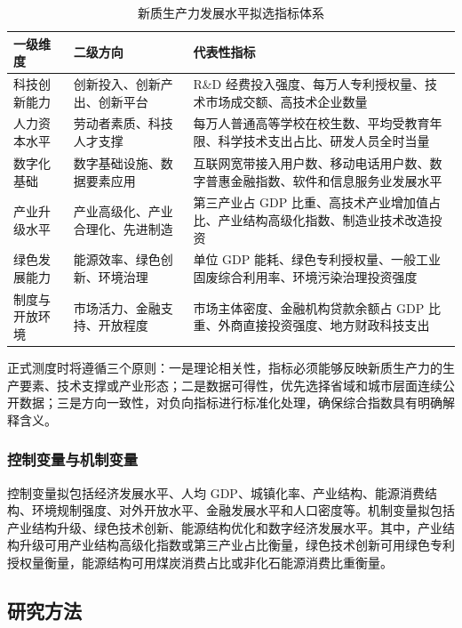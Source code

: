 \documentclass[UTF8,a4paper,zihao=-4,fontset=windows]{ctexart}
\begin{document}
\begin{longtable}{>{\raggedright\arraybackslash}p{}>{\raggedright\arraybackslash}p{}>{\raggedright\arraybackslash}p{}}
  \caption{新质生产力发展水平拟选指标体系}\\
  \toprule
  一级维度 & 二级方向 & 代表性指标\\
  \midrule
  科技创新能力 & 创新投入、创新产出、创新平台 & R\&D 经费投入强度、每万人专利授权量、技术市场成交额、高技术企业数量\\
  人力资本水平 & 劳动者素质、科技人才支撑 & 每万人普通高等学校在校生数、平均受教育年限、科学技术支出占比、研发人员全时当量\\
  数字化基础 & 数字基础设施、数据要素应用 & 互联网宽带接入用户数、移动电话用户数、数字普惠金融指数、软件和信息服务业发展水平\\
  产业升级水平 & 产业高级化、产业合理化、先进制造 & 第三产业占 GDP 比重、高技术产业增加值占比、产业结构高级化指数、制造业技术改造投资\\
  绿色发展能力 & 能源效率、绿色创新、环境治理 & 单位 GDP 能耗、绿色专利授权量、一般工业固废综合利用率、环境污染治理投资强度\\
  制度与开放环境 & 市场活力、金融支持、开放程度 & 市场主体密度、金融机构贷款余额占 GDP 比重、外商直接投资强度、地方财政科技支出\\
  \bottomrule
\end{longtable}

正式测度时将遵循三个原则：一是理论相关性，指标必须能够反映新质生产力的生产要素、技术支撑或产业形态；二是数据可得性，优先选择省域和城市层面连续公开数据；三是方向一致性，对负向指标进行标准化处理，确保综合指数具有明确解释含义。

\subsubsection{控制变量与机制变量}

控制变量拟包括经济发展水平、人均 GDP、城镇化率、产业结构、能源消费结构、环境规制强度、对外开放水平、金融发展水平和人口密度等。机制变量拟包括产业结构升级、绿色技术创新、能源结构优化和数字经济发展水平。其中，产业结构升级可用产业结构高级化指数或第三产业占比衡量，绿色技术创新可用绿色专利授权量衡量，能源结构可用煤炭消费占比或非化石能源消费比重衡量。

\subsection{研究方法}
\end{document}
